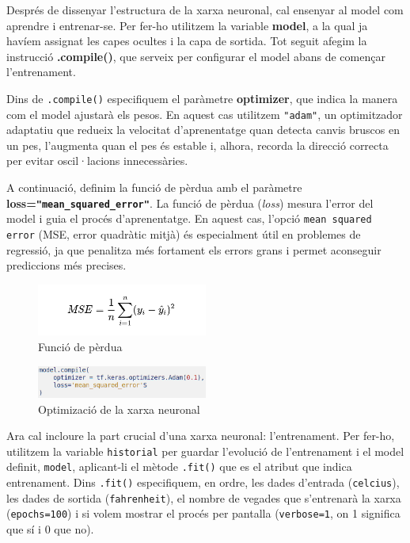 Després de dissenyar l’estructura de la xarxa neuronal, cal ensenyar al model com aprendre i entrenar-se.
Per fer-ho utilitzem la variable \textbf{model}, a la qual ja havíem assignat les capes ocultes i la capa de sortida.
Tot seguit afegim la instrucció \textbf{.compile()}, que serveix per configurar el model abans de començar l’entrenament.

Dins de \texttt{.compile()} especifiquem el paràmetre \textbf{optimizer}, que indica la manera com el model ajustarà els pesos.
En aquest cas utilitzem \texttt{"adam"}, un optimitzador adaptatiu que redueix la velocitat d’aprenentatge quan detecta canvis bruscos en un pes,
l’augmenta quan el pes és estable i, alhora, recorda la direcció correcta per evitar oscil·lacions innecessàries.

A continuació, definim la funció de pèrdua amb el paràmetre \textbf{loss=\texttt{"mean\_squared\_error"}}.
La funció de pèrdua (\textit{loss}) mesura l’error del model i guia el procés d’aprenentatge.
En aquest cas, l’opció \texttt{mean squared error} (MSE, error quadràtic mitjà) és especialment útil en problemes de regressió,
ja que penalitza més fortament els errors grans i permet aconseguir prediccions més precises.


\begin{figure}[H]
    \centering
    \includegraphics[width=0.5\textwidth]{./figures/5.png}
    \caption{Funció de pèrdua}
\end{figure}


\begin{figure}[H]
    \centering
    \includegraphics[width=0.5\textwidth]{./figures/4.png}
    \caption{Optimizació de la xarxa neuronal}
\end{figure}

Ara cal incloure la part crucial d'una xarxa neuronal: l'entrenament. Per fer-ho, utilitzem la variable \texttt{historial} per guardar l'evolució de l'entrenament i el model definit, \texttt{model}, aplicant-li el mètode \texttt{.fit()} que es el atribut que indica entrenament. Dins \texttt{.fit()} especifiquem, en ordre, les dades d'entrada (\texttt{celcius}), les dades de sortida (\texttt{fahrenheit}), el nombre de vegades que s'entrenarà la xarxa (\texttt{epochs=100}) i si volem mostrar el procés per pantalla (\texttt{verbose=1}, on 1 significa que sí i 0 que no).

